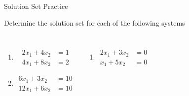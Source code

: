 \documentclass[xcoler=dvipsnames, aspectratio=169]{beamer}
\begin{document}
\begin{frame}{Solution Set Practice}
    \begin{practice}
        Determine the solution set for each of the following systems
        \begin{columns}
            \begin{enumerate}
                \item \begin{align*}
                        2x_1 + 4x_2 &= 1\\
                        4x_1 + 8x_2 &= 2
                \end{align*}
                \item \begin{align*}
                        6x_1 + 3x_2 &= 10\\
                        12x_1 + 6x_2 &= 10
                \end{align*}
            \end{enumerate}
            \begin{enumerate}\addtocounter{enumi}{2}
                \item \begin{align*}
                        2x_1 + 3x_2 &=0 \\
                         x_1 + 5x_2 &= 0
                \end{align*}
            \end{enumerate}
        \end{columns}
    \end{practice}
\end{frame}
\end{document}
